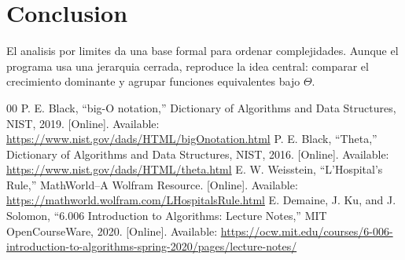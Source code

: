 \documentclass[conference]{IEEEtran}
\begin{document}
\section{Conclusion}
El analisis por limites da una base formal para ordenar complejidades. Aunque
el programa usa una jerarquia cerrada, reproduce la idea central: comparar el
crecimiento dominante y agrupar funciones equivalentes bajo $\Theta$.

\begin{thebibliography}{00}
 P. E. Black, ``big-O notation,'' Dictionary of Algorithms and Data Structures, NIST, 2019. [Online]. Available: \url{https://www.nist.gov/dads/HTML/bigOnotation.html}
 P. E. Black, ``Theta,'' Dictionary of Algorithms and Data Structures, NIST, 2016. [Online]. Available: \url{https://www.nist.gov/dads/HTML/theta.html}
 E. W. Weisstein, ``L'Hospital's Rule,'' MathWorld--A Wolfram Resource. [Online]. Available: \url{https://mathworld.wolfram.com/LHospitalsRule.html}
 E. Demaine, J. Ku, and J. Solomon, ``6.006 Introduction to Algorithms: Lecture Notes,'' MIT OpenCourseWare, 2020. [Online]. Available: \url{https://ocw.mit.edu/courses/6-006-introduction-to-algorithms-spring-2020/pages/lecture-notes/}
\end{thebibliography}
\end{document}
